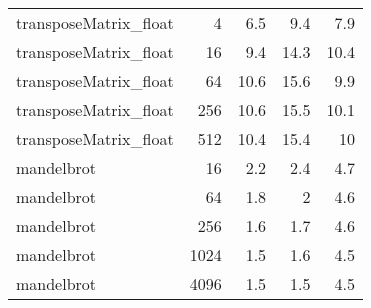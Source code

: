\begin{tabular}{lrrrr}
 transposeMatrix\_float  &      4 &                 6.5 &               9.4 &                 7.9 \\
 transposeMatrix\_float  &     16 &                 9.4 &              14.3 &                10.4 \\
 transposeMatrix\_float  &     64 &                10.6 &              15.6 &                 9.9 \\
 transposeMatrix\_float  &    256 &                10.6 &              15.5 &                10.1 \\
 transposeMatrix\_float  &    512 &                10.4 &              15.4 &                10   \\
 mandelbrot             &     16 &                 2.2 &               2.4 &                 4.7 \\
 mandelbrot             &     64 &                 1.8 &               2   &                 4.6 \\
 mandelbrot             &    256 &                 1.6 &               1.7 &                 4.6 \\
 mandelbrot             &   1024 &                 1.5 &               1.6 &                 4.5 \\
 mandelbrot             &   4096 &                 1.5 &               1.5 &                 4.5 \\
\bottomrule
\end{tabular}